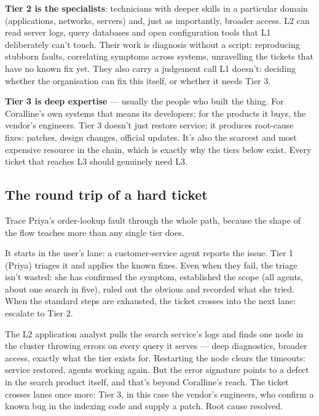 \textbf{Tier 2 is the specialists}: technicians with deeper skills in a particular domain (applications, networks, servers) and, just as importantly, broader access. L2 can read server logs, query databases and open configuration tools that L1 deliberately can't touch. Their work is diagnosis without a script: reproducing stubborn faults, correlating symptoms across systems, unravelling the tickets that have no known fix yet. They also carry a judgement call L1 doesn't: deciding whether the organisation can fix this itself, or whether it needs Tier 3.


\textbf{Tier 3 is deep expertise} — usually the people who built the thing. For Coralline's own systems that means its developers; for the products it buys, the vendor's engineers. Tier 3 doesn't just restore service; it produces root-cause fixes: patches, design changes, official updates. It's also the scarcest and most expensive resource in the chain, which is exactly why the tiers below exist. Every ticket that reaches L3 should genuinely need L3.



\subsection{The round trip of a hard ticket}


Trace Priya's order-lookup fault through the whole path, because the shape of the flow teaches more than any single tier does.


It starts in the user's lane: a customer-service agent reports the issue. Tier 1 (Priya) triages it and applies the known fixes. Even when they fail, the triage isn't wasted: she has confirmed the symptom, established the scope (all agents, about one search in five), ruled out the obvious and recorded what she tried. When the standard steps are exhausted, the ticket crosses into the next lane: escalate to Tier 2.


The L2 application analyst pulls the search service's logs and finds one node in the cluster throwing errors on every query it serves — deep diagnostics, broader access, exactly what the tier exists for. Restarting the node clears the timeouts: service restored, agents working again. But the error signature points to a defect in the search product itself, and that's beyond Coralline's reach. The ticket crosses lanes once more: Tier 3, in this case the vendor's engineers, who confirm a known bug in the indexing code and supply a patch. Root cause resolved.


